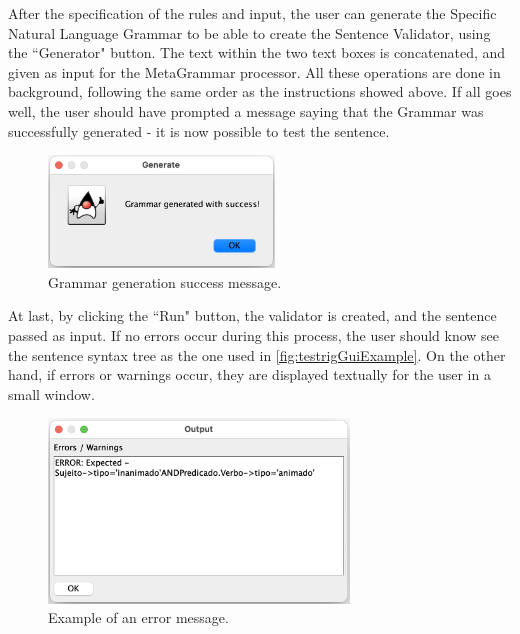 After the specification of the rules and input, the user can generate the Specific Natural Language Grammar to be able to create the Sentence Validator,
using the ``Generator" button.
The text within the two text boxes is concatenated, and given as input for the MetaGrammar processor.
All these operations are done in background, following the same order as the instructions showed above.
If all goes well, the user should have prompted a message saying that the Grammar was successfully generated - it is now possible to test the sentence.

\begin{figure}[h]
    \centering
    \includegraphics[width=6cm]{images/grammar_gen_success.png}
    \caption{Grammar generation success message.}
    \label{fig:grammarGenSuccess}
\end{figure}

\newpage
At last, by clicking the ``Run" button, the validator is created, and the sentence passed as input.
If no errors occur during this process, the user should know see the sentence syntax tree as the one used in \autoref{fig:testrigGuiExample}.
On the other hand, if errors or warnings occur, they are displayed textually for the user in a small window.

\begin{figure}[h]
    \centering
    \includegraphics[width=8cm]{images/lyntax_error_window.png}
    \caption{Example of an error message.}
    \label{fig:lyntaxErrorWindow}
\end{figure}

